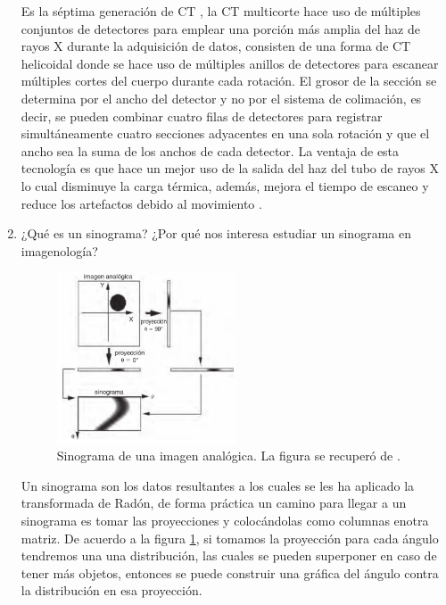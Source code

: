 \begin{enumerate}[1.]
Es la séptima generación de CT \citep{IM}, la CT multicorte hace uso de múltiples conjuntos de detectores para emplear una porción más amplia del haz de rayos X durante la adquisición de datos, consisten de una forma de CT  helicoidal donde se hace uso de múltiples anillos de detectores para escanear múltiples cortes del cuerpo durante cada rotación. El grosor de la sección se determina por el ancho del detector y no por el sistema de colimación, es decir, se pueden combinar cuatro filas de detectores para registrar simultáneamente cuatro secciones adyacentes en una sola rotación y que el ancho sea la suma de los anchos de cada detector. La ventaja de esta tecnología es que hace un mejor uso de la salida del haz del tubo de rayos X lo cual disminuye la carga térmica, además, mejora el tiempo de escaneo y reduce los artefactos debido al movimiento \citep{jerro,russ}.


\pagebreak

\item ¿Qué es un sinograma? ¿Por qué nos interesa estudiar un sinograma en imagenología?


\begin{figure}[!ht]
  \centering
  \includegraphics[width=0.5\textwidth]{./figuras/p4_sino.png}
  \caption{Sinograma de una imagen analógica. La figura se recuperó de \citep{andre}.}
  \label{p4:sino}
  \end{figure}

Un sinograma son los datos resultantes a los cuales se les ha aplicado la transformada de Radón, de forma práctica un camino para llegar a un sinograma es tomar las proyecciones y colocándolas como columnas enotra matriz. De acuerdo a la figura \ref{p4:sino}, si tomamos la proyección para cada ángulo tendremos una una distribución, las cuales se pueden superponer en caso de tener más objetos, entonces se puede construir una gráfica del ángulo contra la distribución en esa proyección. 


\end{enumerate}

